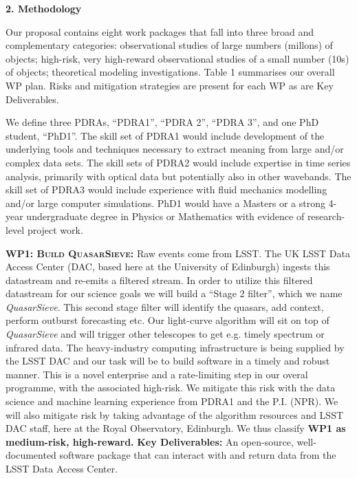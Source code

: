 \documentclass[oneside, a4paper, onecolumn, 11pt]{article}
\begin{document}
\medskip
\medskip
\noindent
\large
{\bf{\textcolor{Cerulean}{2. Methodology}}}
\normalsize

\noindent
Our proposal contains eight work packages that fall into three broad
and complementary categories: observational studies of large numbers
(millons) of objects; high-risk, very high-reward observational
studies of a small number (10s) of objects; theoretical modeling
investigations. Table 1 summarises our overall WP plan. Risks and
mitigation strategies are present for each WP as are Key Deliverables.

\smallskip
\smallskip
\noindent
We define three PDRAs, ``PDRA1'', ``PDRA 2'', ``PDRA 3'', and one PhD
student, ``PhD1''.  The skill set of PDRA1 would include development
of the underlying tools and techniques necessary to extract meaning
from large and/or complex data sets.  The skill sets of PDRA2 would
include expertise in time series analysis, primarily with optical
data but potentially also in other wavebands.  The skill set of PDRA3
would include experience with fluid mechanics modelling and/or large
computer simulations.  PhD1 would have a Masters or a strong 4-year
undergraduate degree in Physics or Mathematics with evidence of
research-level project work.


\smallskip
\smallskip
\noindent
\textbf{\textsc{WP1: Build QuasarSieve:}} 
Raw events come from LSST. The UK LSST Data Access Center (DAC, based
here at the University of Edinburgh) ingests this datastream and
re-emits a filtered stream. In order to utilize this filtered
datastream for our science goals we will build a ``Stage 2 filter'',
which we name {\it QuasarSieve}.  This second stage filter will
identify the quasars, add context, perform outburst forecasting etc.
Our light-curve algorithm will sit on top of {\it QuasarSieve} and
will trigger other telescopes to get e.g. timely spectrum or infrared
data.
The heavy-industry computing infrastructure is being supplied by the
LSST DAC and our task will be to build software in a timely and robust
manner.  This is a novel enterprise and a rate-limiting step in our
overal programme, with the associated high-risk.  We mitigate this
risk with the data science and machine learning experience from PDRA1
and the P.I. (NPR).  We will also mitigate risk by taking advantage of
the algorithm resources and LSST DAC staff, here at the Royal
Observatory, Edinburgh.  We thus classify {\bf WP1 as medium-risk,
high-reward.}  {\bf Key Deliverables:} An open-source, well-documented
software package that can interact with and return data from the LSST
Data Access Center.
\end{document}
